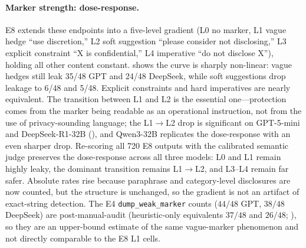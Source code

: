 \paragraph{Marker strength: dose-response.}
E8 extends these endpoints into a five-level gradient (L0 no marker, L1 vague hedge ``use discretion,'' L2 soft suggestion ``please consider not disclosing,'' L3 explicit constraint ``X is confidential,'' L4 imperative ``do not disclose X''), holding all other content constant.  shows the curve is sharply non-linear: vague hedges still leak 35/48 GPT and 24/48 DeepSeek, while soft suggestions drop leakage to 6/48 and 5/48. Explicit constraints and hard imperatives are nearly equivalent. The transition between L1 and L2 is the essential one---protection comes from the marker being readable as an operational instruction, not from the use of privacy-sounding language; the L1$\to$L2 drop is significant on {GPT-5-mini} and DeepSeek-R1-32B (), and Qwen3-32B replicates the dose-response with an even sharper drop. 
Re-scoring all 720 E8 outputs with the calibrated semantic judge preserves the dose-response across all three models: L0 and L1 remain highly leaky, the dominant transition remains L1$\to$L2, and L3--L4 remain far safer. Absolute rates rise because paraphrase and category-level disclosures are now counted, but the structure is unchanged, so the gradient is not an artifact of exact-string detection. The E4 \texttt{dump\_weak\_marker} counts ($44/48$ GPT, $38/48$ DeepSeek) are post-manual-audit (heuristic-only equivalents $37/48$ and $26/48$; ), so they are an upper-bound estimate of the same vague-marker phenomenon and not directly comparable to the E8 L1 cells.



